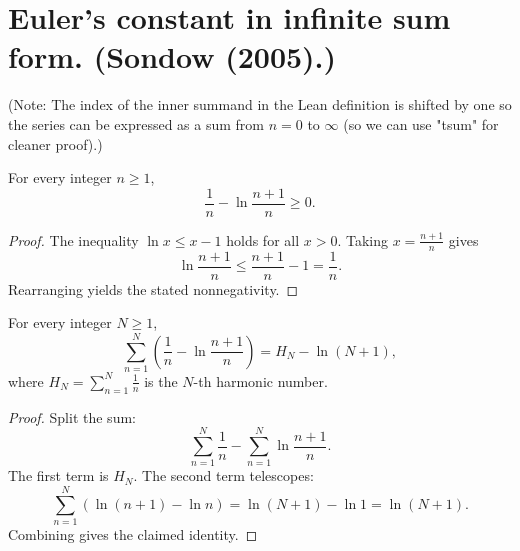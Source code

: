 %

\chapter{Euler's constant in infinite sum form. (Sondow (2005).)}

(Note: The index of the inner summand in the Lean definition is shifted by one so the series can be expressed as a sum from $n=0$ to $\infty$ (so we can use "tsum" for cleaner proof).)

\begin{lemma}
  \label{lem:eulerMascheroni_inner_nonneg}
  \leanok
  For every integer $n \ge 1$,
  $$
    \frac{1}{n} - \ln{\frac{n+1}{n}} \ge 0.
  $$
\end{lemma}

\begin{proof}
  \leanok
  The inequality $\ln x \le x-1$ holds for all $x > 0$. Taking
  $x=\frac{n+1}{n}$ gives
  $$
    \ln{\frac{n+1}{n}} \le \frac{n+1}{n}-1 = \frac{1}{n}.
  $$
  Rearranging yields the stated nonnegativity.
\end{proof}

\begin{lemma}
  \label{lem:eulerMascheroni_tsum_partial}
  \leanok
  For every integer $N \ge 1$,
  $$
    \sum_{n=1}^{N}\left(\frac{1}{n} - \ln{\frac{n+1}{n}}\right)
    = H_{N} - \ln{\left(N+1\right)},
  $$
  where $H_{N}=\sum_{n=1}^N \frac{1}{n}$ is the $N$-th harmonic number.
\end{lemma}

\begin{proof}
  \leanok
  Split the sum:
  $$
    \sum_{n=1}^{N}\frac{1}{n} - \sum_{n=1}^{N}\ln{\frac{n+1}{n}}.
  $$
  The first term is $H_{N}$. The second term telescopes:
  $$
    \sum_{n=1}^{N}\left(\ln(n+1)-\ln n\right)=\ln{\left(N+1\right)}-\ln 1=\ln{\left(N+1\right)}.
  $$
  Combining gives the claimed identity.
\end{proof}

